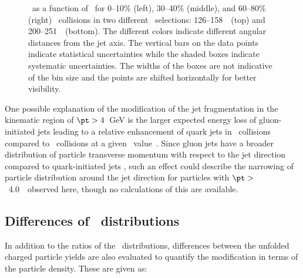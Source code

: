\begin{figure}[h]
{\begin{tabular}{ccc}
\end{tabular} 
}
   \caption{\RDptr\ as a function of \pt\ for  0--10\% (left), 30--40\% (middle), and 60--80\% (right) \PbPb\ collisions in two different \ptjet\ selections: 126--158~\GeV\ (top) and 200--251~\GeV\ (bottom). The different colors indicate different angular distances from the jet axis. The vertical bars on the data points indicate statistical uncertainties while the shaded boxes indicate systematic uncertainties. The widths of the boxes are not indicative of the bin size and the points are shifted horizontally for better visibility.}
      \label{fig:pttrkdep}
\end{figure}


One possible explanation of the modification of the 
jet fragmentation in the kinematic region of \mbox{$\pt > 4$ GeV} is the larger expected energy loss
of gluon-initiated jets leading to a relative enhancement of quark jets in \pbpb\ collisions compared
to \pp\ collisions at a given \ptjet\ value~\cite{Aaboud:2018hpb, Spousta:2015fca}. Since gluon jets have a broader distribution of particle transverse momentum with respect to the jet direction compared to quark-initiated jets \cite{OPAL:1995ab}, 
such an effect could describe the narrowing of particle distribution around the jet direction for particles with $\pt >$~4.0~\GeV\
observed here, though no calculations of this are available.





\subsection{Differences of \Dptr\ distributions}
\label{sec:discussion_delta_dptr}
In addition to the ratios of the \Dptr\ distributions, differences between the unfolded charged particle yields are also evaluated to quantify the modification in terms of the particle density. These are given as:

